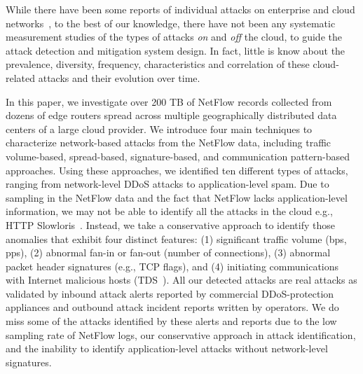 While there have been some reports of individual attacks on enterprise and cloud networks~\cite{googlesecurityreport,Prolexic}, to the best of our knowledge, there have not been any systematic measurement studies of the types of attacks {\em on} and {\em off} the cloud, to guide the attack detection and mitigation system design. In fact, little is know about the prevalence, diversity, frequency, characteristics and correlation of these cloud-related attacks and their evolution over time. 

%

In this paper, we investigate over 200 TB of NetFlow records collected from
dozens of edge routers spread across multiple geographically distributed data
centers of a large cloud provider.  We introduce four main techniques to
characterize network-based attacks from the NetFlow data, including traffic
volume-based, spread-based, signature-based, and communication pattern-based
approaches. Using these approaches, we identified ten different types of
attacks, ranging from network-level DDoS attacks to application-level spam.
Due to sampling in the NetFlow data and the fact that NetFlow lacks
application-level information, we may not be able to identify all the attacks
in the cloud e.g., HTTP Slowloris~\cite{cambiaso2012taxonomy}. 
Instead, we take a conservative approach to
identify those anomalies that exhibit four distinct features: (1) significant
traffic volume (bps, pps), (2) abnormal fan-in or fan-out (number of connections), (3)
abnormal packet header signatures (e.g., TCP flags), and (4) initiating communications with Internet malicious hosts (TDS~\cite{tds}).
All our detected attacks are real attacks as validated by inbound attack alerts reported by 
commercial DDoS-protection appliances and outbound attack incident reports written by operators. 
We do miss some of the attacks identified by these alerts and reports due to the low sampling rate of NetFlow logs, our conservative approach in attack identification, and the inability to identify application-level attacks without network-level signatures.

